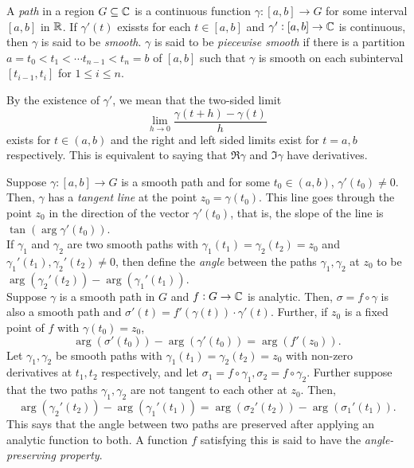 	\begin{fdef}
		A \emph{path} in a region $G \subseteq \mathbb{C}$ is a continuous function $\gamma:[a,b]\to G$ for some interval $[a,b]$ in $\mathbb{R}$. If $\gamma'(t)$ exissts for each $t \in [a,b]$ and $\gamma':[a,b]\to\mathbb{C}$ is continuous, then $\gamma$ is said to be \emph{smooth}. $\gamma$ is said to be \emph{piecewise smooth} if there is a partition $a=t_0 < t_1 < \cdots t_{n-1} < t_n = b$ of $[a,b]$ such that $\gamma$ is smooth on each subinterval $[t_{i-1},t_i]$ for $1\le i\le n$.
	\end{fdef}

	By the existence of $\gamma'$, we mean that the two-sided limit
	\[ \lim_{h\to 0} \frac{\gamma(t+h)-\gamma(t)}{h} \]
	exists for $t \in (a,b)$ and the right and left sided limits exist for $t = a,b$ respectively. This is equivalent to saying that $\Re \gamma$ and $\Im \gamma$ have derivatives.

	Suppose $\gamma : [a,b] \to G$ is a smooth path and for some $t_0 \in (a,b)$, $\gamma'(t_0) \ne 0$. Then, $\gamma$ has a \emph{tangent line} at the point $z_0 = \gamma(t_0)$. This line goes through the point $z_0$ in the direction of the vector $\gamma'(t_0)$, that is, the slope of the line is $\tan(\arg \gamma'(t_0))$.\\

	If $\gamma_1$ and $\gamma_2$ are two smooth paths with $\gamma_1(t_1) = \gamma_2(t_2) = z_0$ and $\gamma_1'(t_1),\gamma_2'(t_2) \ne 0$, then define the \emph{angle} between the paths $\gamma_1,\gamma_2$ at $z_0$ to be $\arg(\gamma_2'(t_2)) - \arg(\gamma_1'(t_1))$.\\

	Suppose $\gamma$ is a smooth path in $G$ and $f:G\to\mathbb{C}$ is analytic. Then, $\sigma = f \circ \gamma$ is also a smooth path and $\sigma'(t) = f'(\gamma(t)) \cdot \gamma'(t)$. Further, if $z_0$ is a fixed point of $f$ with $\gamma(t_0) = z_0$,
	\[ \arg(\sigma'(t_0)) - \arg(\gamma'(t_0)) = \arg(f'(z_0)). \]
	Let $\gamma_1,\gamma_2$ be smooth paths with $\gamma_1(t_1) = \gamma_2(t_2) = z_0$ with non-zero derivatives at $t_1,t_2$ respectively, and let $\sigma_1 = f \circ \gamma_1, \sigma_2 = f \circ \gamma_2$. Further suppose that the two paths $\gamma_1,\gamma_2$ are not tangent to each other at $z_0$. Then,
	\[ \arg(\gamma_2'(t_2)) - \arg(\gamma_1'(t_1)) = \arg(\sigma_2'(t_2)) - \arg(\sigma_1'(t_1)). \]
	This says that the angle between two paths are preserved after applying an analytic function to both. A function $f$ satisfying this is said to have the \emph{angle-preserving property}.


